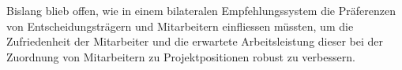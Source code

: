 Bislang blieb offen, wie in einem bilateralen Empfehlungssystem die Präferenzen von Entscheidungsträgern und Mitarbeitern einfliessen müssten, um die Zufriedenheit der Mitarbeiter und die erwartete Arbeitsleistung dieser bei der Zuordnung von Mitarbeitern zu Projektpositionen robust zu verbessern.






